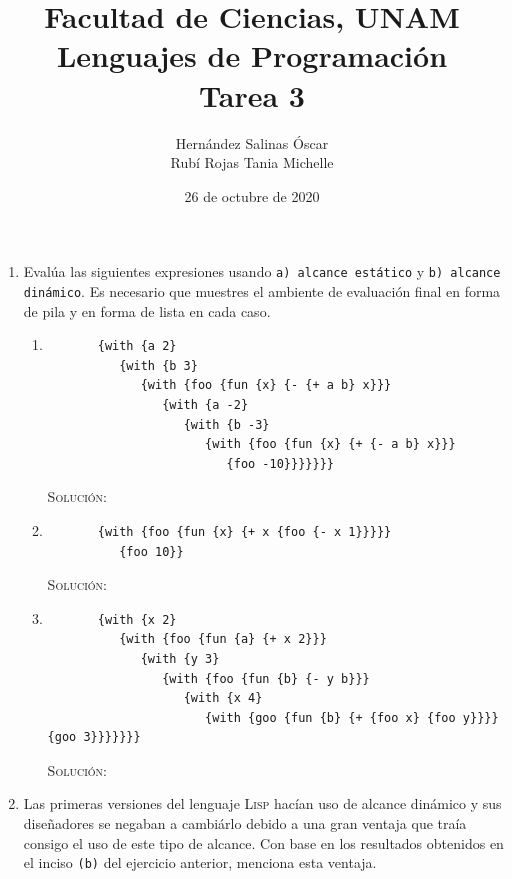 \documentclass[letterpaper,11pt]{article}
\title{Facultad de Ciencias, UNAM \\ 
       Lenguajes de Programación \\ 
       Tarea 3}
\author{Hernández Salinas Óscar \\ 
        Rubí Rojas Tania Michelle }
\date{26 de octubre de 2020}
\begin{document}
\maketitle

\begin{enumerate}
   \item Evalúa las siguientes expresiones usando \texttt{a) alcance estático}
   y \texttt{b) alcance dinámico}. Es necesario que muestres el ambiente de 
   evaluación final en forma de pila y en forma de lista en cada caso.
   \begin{enumerate}
       \item 
       \begin{verbatim}
       {with {a 2} 
          {with {b 3} 
             {with {foo {fun {x} {- {+ a b} x}}} 
                {with {a -2} 
                   {with {b -3} 
                      {with {foo {fun {x} {+ {- a b} x}}} 
                         {foo -10}}}}}}}
       \end{verbatim}

       \textsc{Solución:}

       \item 
       \begin{verbatim}
       {with {foo {fun {x} {+ x {foo {- x 1}}}}} 
          {foo 10}}
       \end{verbatim}

       \textsc{Solución:}

       \item 
       \begin{verbatim}
       {with {x 2} 
          {with {foo {fun {a} {+ x 2}}} 
             {with {y 3} 
                {with {foo {fun {b} {- y b}}} 
                   {with {x 4} 
                      {with {goo {fun {b} {+ {foo x} {foo y}}}} {goo 3}}}}}}}
       \end{verbatim}

       \textsc{Solución:}
   \end{enumerate}

   \item Las primeras versiones del lenguaje \textsc{Lisp} hacían uso de 
   alcance dinámico y sus diseñadores se negaban a cambiárlo debido a una 
   gran ventaja que traía consigo el uso de este tipo de alcance. Con base 
   en los resultados obtenidos en el inciso \texttt{(b)} del ejercicio 
   anterior, menciona esta ventaja.


\end{enumerate}
\end{document}
